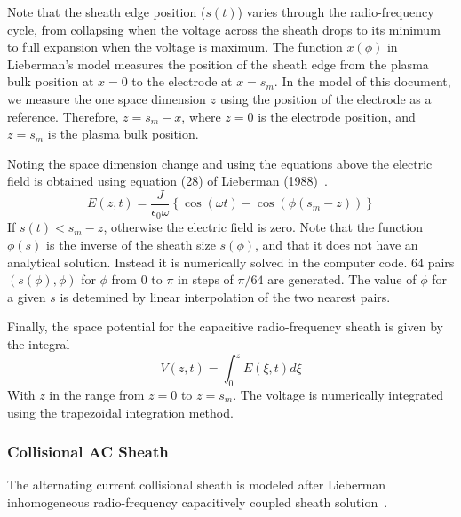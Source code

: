 Note that the sheath edge position ($s(t)$) varies through the radio-frequency cycle, from collapsing when the voltage across the sheath drops to its minimum to full expansion when the voltage is maximum. The function $x(\phi)$ in Lieberman's model measures the position of the sheath edge from the plasma bulk position at $x=0$ to the electrode at $x=s_m$. In the model of this document, we measure the one space dimension $z$ using the position of the electrode as a reference. Therefore, $z = s_m - x$, where $z=0$ is the electrode position, and $z=s_m$ is the plasma bulk position.

Noting the space dimension change and using the equations above the electric field is obtained using equation (28) of Lieberman (1988)~\cite{Lieberman1988}.  
\begin{equation}
E(z,t) = \frac{J}{\epsilon_0 \omega} \left \{ \cos(\omega t) - \cos(\phi(s_m - z)) \right \} 
\end{equation}
If $s(t)<s_m-z$, otherwise the electric field is zero. Note that the function $\phi(s)$ is the inverse of the sheath size $s(\phi)$, and that it does not have an analytical solution. Instead it is numerically solved in the computer code. 64 pairs $(s(\phi), \phi)$ for $\phi$ from 0 to $\pi$ in steps of $\pi/64$ are generated. The value of $\phi$ for a given $s$ is detemined by linear interpolation of the two nearest pairs.   

Finally, the space potential for the capacitive radio-frequency sheath is given by the integral
\begin{equation}
V(z,t) = \int_{0}^{z} E(\xi, t) d\xi
\end{equation}
With $z$ in the range from $z=0$ to $z=s_m$. The voltage is numerically integrated using the trapezoidal integration method.  






\subsubsection{Collisional AC Sheath}

The alternating current collisional sheath is modeled after Lieberman inhomogeneous radio-frequency capacitively coupled sheath solution~\cite{Lieberman1989}. 

